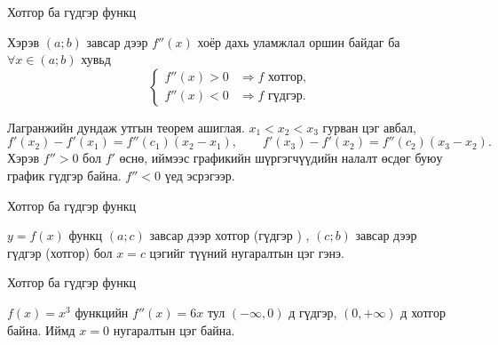 \begin{frame}[allowframebreaks]{Хотгор ба гүдгэр функц}
\begin{theorem}
Хэрэв $(a;b)$  завсар дээр $f''(x)$ хоёр дахь уламжлал оршин байдаг ба $\forall x\in (a;b)$ хувьд
\[
\begin{cases}
f''(x)>0 &\Rightarrow f \text{ хотгор},\\[4pt]
f''(x)<0 &\Rightarrow f \text{ гүдгэр}.
\end{cases}
\]
\end{theorem}

\begin{prof}
Лагранжийн дундаж утгын теорем ашиглая.
$x_1<x_2<x_3$ гурван цэг авбал,
\[
f'(x_2)-f'(x_1)=f''(c_1)(x_2-x_1),\qquad
f'(x_3)-f'(x_2)=f''(c_2)(x_3-x_2).
\]
Хэрэв $f''>0$ бол $f'$ өснө, иймээс графикийн шүргэгчүүдийн налалт өсдөг буюу график гүдгэр байна. $f''<0$ үед эсрэгээр.
\end{prof}
\end{frame}

\begin{frame}[allowframebreaks]{Хотгор ба гүдгэр функц}
\begin{definition}
    $y=f(x)$ функц $(a;c)$ завсар дээр хотгор (гүдгэр ) , $(c;b)$ завсар дээр  гүдгэр  (хотгор)  бол $x=c$ цэгийг түүний нугаралтын цэг гэнэ.
\end{definition}
\end{frame}

\begin{frame}[allowframebreaks]{Хотгор ба гүдгэр функц}
\begin{example}
$f(x)=x^3$ функцийн $f''(x)=6x$ тул $(-\infty,0)$ д гүдгэр, $(0,+\infty)$ д хотгор байна. Иймд $x=0$ нугаралтын цэг байна.
\end{example}

\begin{center}
\begin{fitbox}\end{fitbox}
\end{center}
\end{frame}

